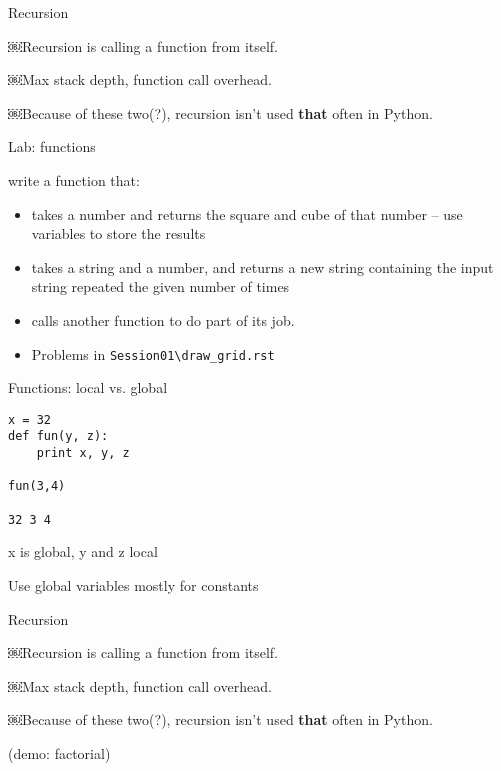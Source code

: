 \documentclass{beamer}
\begin{document}
\begin{frame}[fragile]{Recursion}

\vspace{0.5in}
{\Large￼Recursion is calling a function from itself.}

\vspace{0.5in}
{\Large￼Max stack depth, function call overhead.}

\vspace{0.5in}
{\Large￼Because of these two(?), recursion isn't used {\bf that} often in Python.}

\end{frame}

\begin{frame}[fragile]{Lab: functions}

{\Large write a function that:}
\begin{itemize}
  \item takes a number and returns the square and cube of that number
   -- use variables to store the results
  \item takes a string and a number, and returns a new string containing the input string repeated the given number of times
  \item calls another function to do part of its job.
  \item Problems in \verb|Session01\draw_grid.rst|
  
\end{itemize}

\end{frame}
\begin{frame}[fragile]{Functions: local vs. global}

\begin{verbatim}
x = 32
def fun(y, z):
    print x, y, z

fun(3,4)

32 3 4
\end{verbatim}
{\large x is global, y and z local}

\vfill
{\Large Use global variables mostly for constants}

\end{frame}


\begin{frame}[fragile]{Recursion}

\vfill
{\Large￼Recursion is calling a function from itself.}

\vfill
{\Large￼Max stack depth, function call overhead.}

\vfill
{\Large￼Because of these two(?), recursion isn't used {\bf that} often in Python.}

\vfill
(demo: factorial)
\end{frame}
\end{document}
